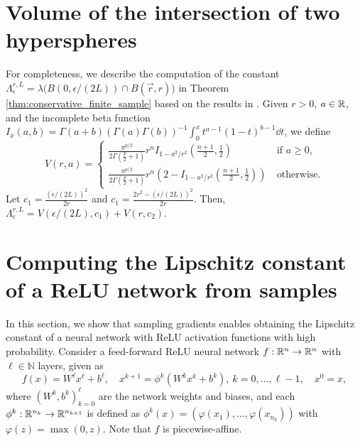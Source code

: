 \documentclass[12pt]{l4dc2022} %
\begin{document}
% 

% 

% 

% 
% 
% 
% 
% 
% 
% 

% 
% 
% 
% 
% 
% 
% 
% 
% 
% 
% 
% 
% 
% 
% 
% 
% 
% 


% 
% 
% 


% 
% 
% 
% 
% 
% 
% 
% 
% 
% 
% 
% 
% 
% 
% 
% 
% 
% 
% 
% 
% 
% 
% 
% 
% 
% 
% 
% 
% 
% 
% 
% 
% 
% 
% 
% 
% 
% 
% 
% 
% 
% 
% 
% 
% 
% 
% 
% 
% 
% 
% 
% 
% 
% 
% 
% 
% 
% 
% 
% 
% 
% 
% 
% 
% 
% 
% 
% 
% 
% 
% 
% 
% 
% 
% 
% 
% 
% 
% 
% 
% 
% 
% 
% 
% 

	
	
	
% 
% 

% 
% 
% 
% 
% 
% 
% 
% 
% 
% 
% 

% 
% 
% 





% 

\section{Volume of the intersection of two hyperspheres}
\label{appendix:spherical_caps}\label{apdx:intersection_spherical_cap}
For completeness, we describe the computation of the constant $\Lambda_{\epsilon}^{r,L}=\lambda\big(
B(0,\epsilon/(2L)) 
\cap B(\vec{r},r)
\big)$ in Theorem \ref{thm:conservative_finite_sample} based on the results in \citep{Li2011,Petitjean2013,MattStackExchange2013}. 
% 
% 
Given $r>0$, $a\in\mathbb{R}$, 
and the incomplete beta function 
$I_x(a,b)=\Gamma(a+b)(\Gamma(a)\Gamma(b))^{-1}\int_0^xt^{a-1}(1-t)^{b-1}\dd t$, we define
$$V(r,a)=\begin{cases}
\frac{\pi^{p/2}}{2\Gamma(\frac{p}{2}+1)}r^nI_{1-a^2/r^2}\left(\frac{n+1}{2},\frac{1}{2}\right)\ &\text{if }a\geq 0,
\\
\frac{\pi^{p/2}}{2\Gamma(\frac{p}{2}+1)}r^n(2-I_{1-a^2/r^2}\left(\frac{n+1}{2},\frac{1}{2}\right))
\ &\text{otherwise.}
\end{cases}
$$
Let 
$c_1=\frac{(\epsilon/(2L))^2}{2r}$ and 
$c_1=\frac{2r^2-(\epsilon/(2L))^2}{2r}$. 
Then, 
$
\Lambda_{\epsilon}^{r,L}
=
V(\epsilon/(2L),c_1) 
+
V(r,c_2)$.


\label{appendix:spherical_caps}
% 
\section{Computing the Lipschitz constant of a ReLU network from samples}\label{appendix:lipschitz_relu}
In this section, we show that sampling gradients enables obtaining the Lipschitz constant of a neural network with ReLU activation functions with high probability. 
Consider a feed-forward ReLU neural network $f:\mathbb{R}^n\rightarrow\mathbb{R}^n$ with $\ell\in\mathbb{N}$ layers, given as 
$$
f(x) = W^\ell x^\ell + b^\ell,
\quad x^{k+1}=\phi^k(W^kx^k+b^k), \ k=0,\dots,\ell-1,
\quad 
x^0 = x,
$$
where $(W^k,b^k)_{k=0}^\ell$ are the network weights and biases, and each $\phi^k:\mathbb{R}^{n_k}\rightarrow\mathbb{R}^{n_{k+1}}$ is defined as 
$\phi^k(x)=(\varphi(x_1),\dots,\varphi(x_{n_k}))
$ with $\varphi(z)=\max(0,z)$. 
% 
Note that $f$ is piecewise-affine. 
\end{document}
